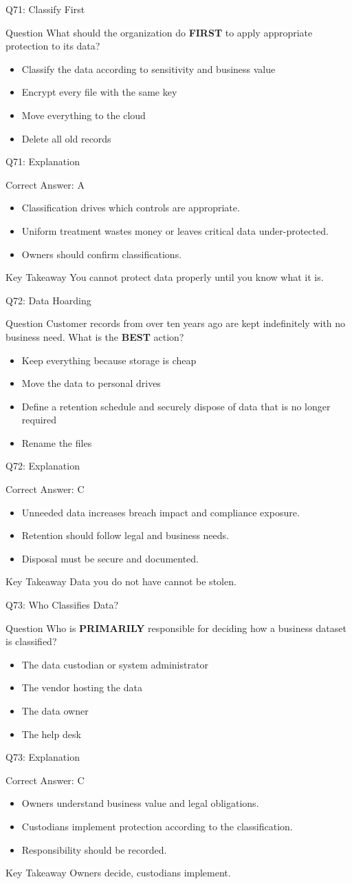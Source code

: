 \documentclass[aspectratio=169]{beamer}
\newcommand{\hq}[7]{%
	\begin{frame}{Q#1: #2}
		\begin{block}{Question}
			#3
		\end{block}
		\begin{itemize}
			#4
		\end{itemize}
	\end{frame}
	\begin{frame}{Q#1: Explanation}
		\begin{block}{Correct Answer: #5}
			\begin{itemize}
				#6
			\end{itemize}
		\end{block}
		\begin{alertblock}{Key Takeaway}
			#7
		\end{alertblock}
	\end{frame}
}
\begin{document}
	\hq{71}{Classify First}
	{What should the organization do \textbf{FIRST} to apply appropriate protection to its data?}
	{\item[\textbf{(A)}] Classify the data according to sensitivity and business value
		\item[\textbf{(B)}] Encrypt every file with the same key
		\item[\textbf{(C)}] Move everything to the cloud
		\item[\textbf{(D)}] Delete all old records}
	{A}
	{\item Classification drives which controls are appropriate.
		\item Uniform treatment wastes money or leaves critical data under-protected.
		\item Owners should confirm classifications.}
	{You cannot protect data properly until you know what it is.}
	
	\hq{72}{Data Hoarding}
	{Customer records from over ten years ago are kept indefinitely with no business need. What is the \textbf{BEST} action?}
	{\item[\textbf{(A)}] Keep everything because storage is cheap
		\item[\textbf{(B)}] Move the data to personal drives
		\item[\textbf{(C)}] Define a retention schedule and securely dispose of data that is no longer required
		\item[\textbf{(D)}] Rename the files}
	{C}
	{\item Unneeded data increases breach impact and compliance exposure.
		\item Retention should follow legal and business needs.
		\item Disposal must be secure and documented.}
	{Data you do not have cannot be stolen.}
	
	\hq{73}{Who Classifies Data?}
	{Who is \textbf{PRIMARILY} responsible for deciding how a business dataset is classified?}
	{\item[\textbf{(A)}] The data custodian or system administrator
		\item[\textbf{(B)}] The vendor hosting the data
		\item[\textbf{(C)}] The data owner
		\item[\textbf{(D)}] The help desk}
	{C}
	{\item Owners understand business value and legal obligations.
		\item Custodians implement protection according to the classification.
		\item Responsibility should be recorded.}
	{Owners decide, custodians implement.}
	
\end{document}
